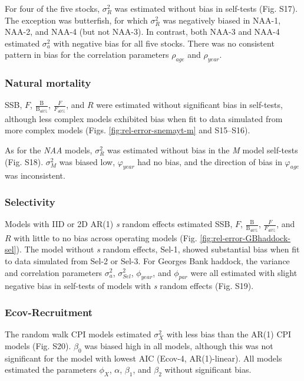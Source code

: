 \documentclass[]{article}
\begin{document}
For four of the five stocks, \(\sigma^2_R\) was estimated without bias
in self-tests (Fig. S17). The exception was butterfish, for which
\(\sigma^2_R\) was negatively biased in NAA-1, NAA-2, and NAA-4 (but not
NAA-3). In contrast, both NAA-3 and NAA-4 estimated \(\sigma^2_a\) with
negative bias for all five stocks. There was no consistent pattern in
bias for the correlation parameters \(\rho_{age}\) and \(\rho_{year}\).

\hypertarget{natural-mortality}{%
\subsubsection{Natural mortality}\label{natural-mortality}}

SSB, \(F\), \(\frac{\text{B}}{\text{B}_{40\%}}\),
\(\frac{F}{F_{40\%}}\), and \(R\) were estimated without significant
bias in self-tests, although less complex models exhibited bias when fit
to data simulated from more complex models (Figs.
\ref{fig:rel-error-snemayt-m} and S15--S16).

As for the \emph{NAA} models, \(\sigma^2_R\) was estimated without bias
in the \emph{M} model self-tests (Fig. S18). \(\sigma^2_M\) was biased
low, \(\varphi_{year}\) had no bias, and the direction of bias in
\(\varphi_{age}\) was inconsistent.

\hypertarget{selectivity}{%
\subsubsection{Selectivity}\label{selectivity}}

Models with IID or 2D AR(1) \emph{s} random effects estimated SSB,
\(F\), \(\frac{\text{B}}{\text{B}_{40\%}}\), \(\frac{F}{F_{40\%}}\), and
\(R\) with little to no bias across operating models (Fig.
\ref{fig:rel-error-GBhaddock-sel}). The model without \emph{s} random
effects, Sel-1, showed substantial bias when fit to data simulated from
Sel-2 or Sel-3. For Georges Bank haddock, the variance and correlation
parameters \(\sigma^2_a\), \(\sigma^2_{Sel}\), \(\phi_{year}\), and
\(\phi_{par}\) were all estimated with slight negative bias in
self-tests of models with \emph{s} random effects (Fig. S19).

\hypertarget{ecov-recruitment}{%
\subsubsection{Ecov-Recruitment}\label{ecov-recruitment}}

The random walk CPI models estimated \(\sigma^2_X\) with less bias than
the AR(1) CPI models (Fig. S20). \(\beta_0\) was biased high in all
models, although this was not significant for the model with lowest AIC
(Ecov-4, AR(1)-linear). All models estimated the parameters \(\phi_X\),
\(\alpha\), \(\beta_1\), and \(\beta_2\) without significant bias.
\end{document}
